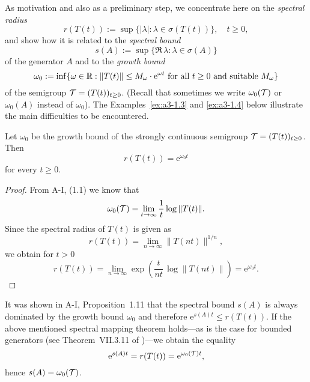 As motivation and also as a preliminary step, we concentrate here on the \emph{spectral radius}
\begin{equation}\label{eq:a3-1.1}
	r(T(t)) := \sup \{ |\lambda| : \lambda \in \sigma(T(t)) \}, \quad t \geq 0 ,
\end{equation}
and show how it is related to the \emph{spectral bound}
\begin{equation}\label{eq:a3-1.2}
	s(A) := \sup \{ \Re\,\lambda : \lambda \in \sigma(A) \}
\end{equation}
of the generator $A$ and to the \emph{growth bound}
\begin{equation}\label{eq:a3-1.3}
	\omega_{0} := \inf \{\omega \in \mathbb{R}  : \|T(t)\| \leq M_{\omega}\cdot \mathrm{e}^{\omega t} \text{ for all } t \geq 0 \text{ and suitable } M_{\omega}\}
\end{equation}
of the semigroup $\mathcal{T} = (T(t))_{t\geq 0}$.
(Recall that sometimes we write $\omega_{0}(\mathcal{T})$ or $\omega_{0}(A)$ instead of $\omega_{0}$).
%
The Examples~\ref{ex:a3-1.3} and \ref{ex:a3-1.4} below illustrate the main difficulties to be encountered.
\begin{proposition}\label{prop:a3-1.1}
Let $\omega_{0}$ be the growth bound of the strongly continuous semigroup $\mathcal{T} = (T(t))_{t\geq 0}$.
Then
\begin{equation}\label{eq:a3-1.4}
	r(T(t)) = \mathrm{e}^{\omega_{0} t}
\end{equation}
for every $t \geq 0$.
\end{proposition}
\begin{proof}
From A-I, (1.1) we know that
\[
    \omega_{0}(\mathcal{T}) = \lim_{t \to \infty} \frac{1}{t} \log \|T(t)\| .
\]
Since the spectral radius of $T(t)$ is given as
\[
    r(T(t)) = \lim_{n \to \infty} \|T(nt)\|^{1/n} ,
\]
we obtain for $t > 0$
\[
    r(T(t)) = \lim_{n \to \infty} \exp\left( \frac{t}{nt}\,\log \|T(nt)\|\right) = \mathrm{e}^{\omega_{0} t} .
\]
\end{proof}
It was shown in A-I, Proposition~1.11 that the spectral bound $s(A)$ is always dominated by the growth bound $\omega_{0}$ and therefore $\mathrm{e}^{s(A)t} \leq r(T(t))$.
If the above mentioned spectral mapping theorem holds---as is the case for bounded generators (\eg see Theorem~VII.3.11 of \citet{dunfordschwartz:1958})---we obtain the equality
\[
    \mathrm{e}^{s(A)t} = r(T(t)) = \mathrm{e}^{\omega_{0}(\mathcal{T}) t} ,
\]
hence $s(A) = \omega_{0}(\mathcal{T})$.
